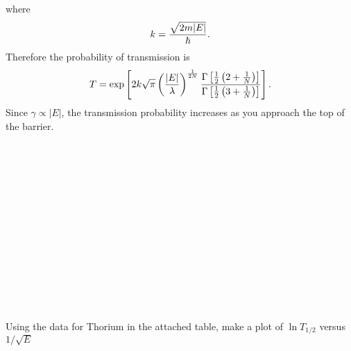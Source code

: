 \documentclass[11pt,letterpaper]{article}
\begin{document}
			{\Gamma{}}
		\ea
		where
		\[
			k = \frac{\sqrt{2m|E|}}{\hbar}.
		\]
		Therefore the probability of transmission is
		\[
			T = \exp\left[2k\sqrt\pi\left(\frac{|E|}{\lambda}\right)^{\frac{1}{2N}}\frac{\Gamma\left[\frac{1}{2}\left(2+\frac{1}{N}\right)\right]}
			{\Gamma\left[\frac{1}{2}\left(3+\frac{1}{N}\right)\right]}\right].
		\]
		Since $\gamma \propto |E|$, the transmission probability increases as you approach the top of the barrier. 
		\\
		\\
		\\ \\ \\ \\ \\ \\ \\ \\ \\ \\ \\ \\
		
	\eenum
	
	
	\item
	\benum
	
		\item
		Using the data for Thorium in the attached table, make a plot of $\ln T_{1/2}$ versus $1/\sqrt E$
		\\
		\\
		
\end{document}
